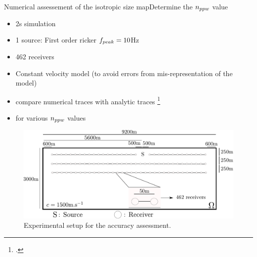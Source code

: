 \begin{frame}{Numerical assessement of the isotropic size map}{Determine the $n_{ppw}$ value}
  \begin{multicols}{2}
    \begin{itemize}
    \item 2s simulation
    \item 1 source: First order ricker ${f_{peak}}=10$Hz
    \item 462 receivers
    \item Constant velocity model (to avoid errors from mis-representation of the model)
    \item compare numerical traces with analytic traces \footcite{gar6more}
    \item for various $n_{ppw}$ values
    \end{itemize}
    \columnbreak
  \begin{figure}[H]
  \centering
  \includegraphics[scale=0.31]{image/precision_test.pdf}
  \caption{Experimental setup for the accuracy assessment.}
  \label{homogeneous_prec}
  \end{figure}
  \end{multicols}
  \end{frame}



